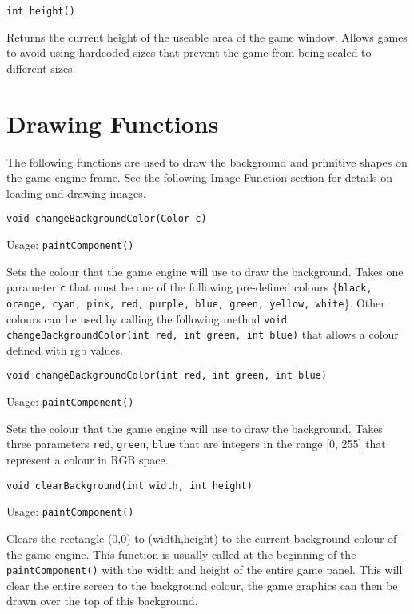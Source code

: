 \documentclass[a4paper, 10pt]{report}
\begin{document}
\hrulefill

{\large {\tt int height()}}

Returns the current height of the useable area of the game window. Allows games to avoid using hardcoded sizes that prevent the game from being scaled to different sizes.

\section{Drawing Functions}

The following functions are used to draw the background and primitive shapes on the game engine frame. See the following Image Function section for details on loading and drawing images.

\hrulefill

{\large {\tt void changeBackgroundColor(Color c)}}

Usage: {\tt paintComponent()}

Sets the colour that the game engine will use to draw the background. Takes one parameter {\tt c} that must be one of the following pre-defined colours \{{\tt black, orange, cyan, pink, red, purple, blue, green, yellow, white}\}. Other colours can be used by calling the following method {\tt void changeBackgroundColor(int red, int green, int blue)} that allows a colour defined with rgb values.

\hrulefill

{\large {\tt void changeBackgroundColor(int red, int green, int blue)}}

Usage: {\tt paintComponent()}

Sets the colour that the game engine will use to draw the background. Takes three parameters {\tt red}, {\tt green}, {\tt blue} that are integers in the range [0, 255] that represent a colour in RGB space.

\hrulefill

{\large {\tt void clearBackground(int width, int height)}}

Usage: {\tt paintComponent()}

Clears the rectangle (0,0) to (width,height) to the current background colour of the game engine. This function is usually called at the beginning of the {\tt paintComponent()} with the width and height of the entire game panel. This will clear the entire screen to the background colour, the game graphics can then be drawn over the top of this background.
\end{document}
